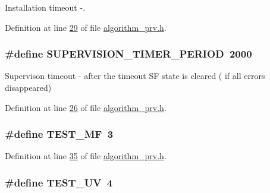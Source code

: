 Installation timeout -\/. 



Definition at line \hyperlink{a00016_source_l00029}{29} of file \hyperlink{a00016_source}{algorithm\+\_\+prv.\+h}.

\hypertarget{a00016_abc6f7a40b6aee60b122db32a0d82126c}{
\subsubsection[{S\+U\+P\+E\+R\+V\+I\+S\+I\+O\+N\+\_\+\+T\+I\+M\+E\+R\+\_\+\+P\+E\+R\+I\+O\+D}]{\setlength{\rightskip}{0pt plus 5cm}\#define S\+U\+P\+E\+R\+V\+I\+S\+I\+O\+N\+\_\+\+T\+I\+M\+E\+R\+\_\+\+P\+E\+R\+I\+O\+D~2000}}\label{a00016_abc6f7a40b6aee60b122db32a0d82126c}


Supervison timeout -\/ after the timeout S\+F state is cleared ( if all errors disappeared) 



Definition at line \hyperlink{a00016_source_l00026}{26} of file \hyperlink{a00016_source}{algorithm\+\_\+prv.\+h}.

\hypertarget{a00016_a73581885168dab0a1659db63d135b1cc}{
\subsubsection[{T\+E\+S\+T\+\_\+\+M\+F}]{\setlength{\rightskip}{0pt plus 5cm}\#define T\+E\+S\+T\+\_\+\+M\+F~3}}\label{a00016_a73581885168dab0a1659db63d135b1cc}


Definition at line \hyperlink{a00016_source_l00035}{35} of file \hyperlink{a00016_source}{algorithm\+\_\+prv.\+h}.

\hypertarget{a00016_aa48458d081f4a50e025e7d67a92f31f5}{
\subsubsection[{T\+E\+S\+T\+\_\+\+U\+V}]{\setlength{\rightskip}{0pt plus 5cm}\#define T\+E\+S\+T\+\_\+\+U\+V~4}}\label{a00016_aa48458d081f4a50e025e7d67a92f31f5}


